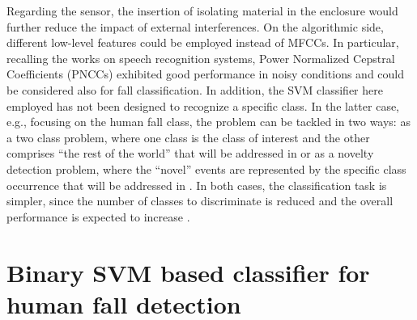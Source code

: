 Regarding the sensor, the insertion of isolating material in the enclosure would further reduce the impact of external interferences. On the algorithmic side, different low-level features could be employed instead of MFCCs. In particular, recalling the works on speech recognition systems, Power Normalized Cepstral Coefficients (PNCCs) \cite{Kim12} exhibited good performance in noisy conditions and could be considered also for fall classification. In addition, the SVM classifier here employed has not been designed to recognize a specific class. In the latter case, e.g., focusing on the human fall class, the problem can be tackled in two ways: as a two class problem, where one class is the class of interest and the other comprises ``the rest of the world'' that will be addressed in  or as a novelty detection problem, where the ``novel'' events are represented by the specific class occurrence that will be addressed in . In both cases, the classification task is simpler, since the number of classes to discriminate is reduced and the overall performance is expected to increase \cite{bishop06}.

\section{Binary SVM based classifier for human fall detection}
\label{sec:biclass_svm}

